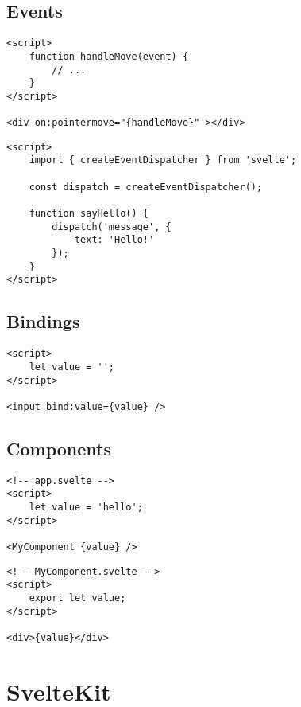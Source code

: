 \subsection{Events}


\begin{verbatim}
<script>
    function handleMove(event) {
        // ...
    }
</script>

<div on:pointermove="{handleMove}" ></div>
\end{verbatim}

\begin{verbatim}
<script>
    import { createEventDispatcher } from 'svelte';

    const dispatch = createEventDispatcher();

    function sayHello() {
        dispatch('message', {
            text: 'Hello!'
        });
    }
</script>
\end{verbatim}

\subsection{Bindings}

\begin{verbatim}
<script>
    let value = '';
</script>

<input bind:value={value} />
\end{verbatim}

\subsection{Components}
\begin{verbatim}
<!-- app.svelte -->
<script>
    let value = 'hello';
</script>

<MyComponent {value} />
\end{verbatim}

\begin{verbatim}
<!-- MyComponent.svelte -->
<script>
    export let value;
</script>

<div>{value}</div>
\end{verbatim}

\section{SvelteKit}
\label{sec:sveltekit}

